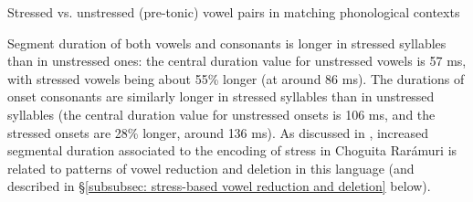 \ea\label{ex: stressed vs. unstressed vowel pairs in matching phonological contexts}
{Stressed vs. unstressed (pre-tonic) vowel pairs in matching phonological contexts}




    \z
\z

Segment duration of both vowels and consonants is longer in stressed syllables than in unstressed ones: the central duration value for unstressed vowels is 57 ms, with stressed vowels being about 55\% longer (at around 86 ms). The durations of onset consonants are similarly longer in stressed syllables than in unstressed syllables (the central duration value for unstressed onsets is 106 ms, and the stressed onsets are 28\% longer, around 136 ms). As discussed in \citet{caballero2015tone}, increased segmental duration associated to the encoding of stress in Choguita Rarámuri is related to patterns of vowel reduction and deletion in this language (and described in §\ref{subsubsec: stress-based vowel reduction and deletion} below).

